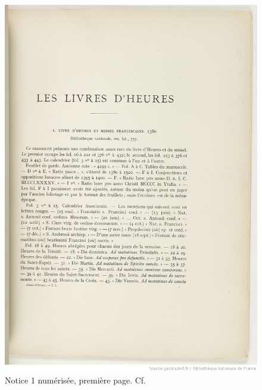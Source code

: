 \documentclass[a4paper,12pt,twoside]{book}
\begin{document}
	\begin{figure}[!h]
    \centering
    \includegraphics[width=15cm]{img/Notices_Leroquais/Notice1/Papier/noticepapier_1_1.jpeg}
    \caption{Notice 1 numérisée, première page. Cf. \cite[p. 1]{Leroquais_notices}}
    \end{figure}
    \clearpage
    
\end{document}
